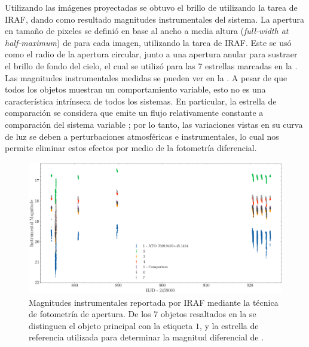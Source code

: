 Utilizando las imágenes proyectadas se obtuvo el brillo de \atoObjId utilizando
la tarea  de IRAF, dando como resultado magnitudes instrumentales
del sistema. La apertura en tamaño de pixeles se definió en base al ancho a
media altura (\textit{full-width at half-maximum}) de \atoObjId para cada
imagen, utilizando la tarea  de IRAF. Este se usó como el radio de
la apertura circular, junto a una apertura anular para sustraer el brillo de
fondo del cielo, el cual se utilizó para las 7 estrellas marcadas en la
. Las magnitudes instrumentales medidas se pueden ver
en la . A pesar de que todos los
objetos muestran un comportamiento variable, esto no es una característica
intrínseca de todos los sistemas. En particular, la estrella de comparación se
considera que emite un flujo relativamente constante a comparación del sistema
variable \atoObjIdNoSpace; por lo tanto, las variaciones vistas en su curva de
luz se deben a perturbaciones atmosféricas e instrumentales, lo cual nos permite
eliminar estos efectos por medio de la fotometría diferencial.

\begin{figure}[!ht]
	\centering
	\includegraphics[scale=0.4]{Observaciones/Secciones/Figures/Figura Magnitud Instrumental Todas.png}
	\caption{Magnitudes instrumentales reportada por IRAF mediante la técnica de
	fotometría de apertura. De los 7 objetos resaltados en la
	 se distinguen el objeto principal \atoObjId con
	la etiqueta $1$, y la estrella de referencia utilizada para determinar la
	magnitud diferencial de \atoObjIdNoSpace. }
	\label{figuraCurvaLuzInstrumentalTodas}
\end{figure}

